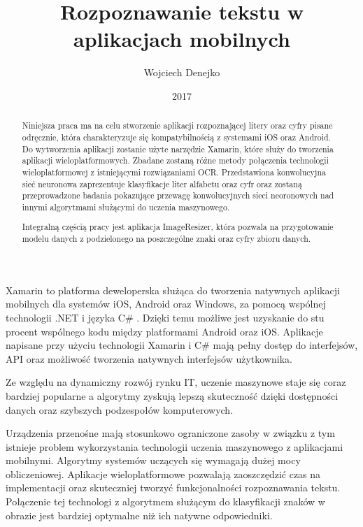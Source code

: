 \documentclass[brudnopis]{xmgr}
\author   {Wojciech Denejko}
\title    {Rozpoznawanie tekstu w aplikacjach mobilnych}
\date     {2017}
\begin{document}
\begin{abstract}
  Niniejsza praca ma na celu stworzenie aplikacji rozpoznającej litery oraz cyfry pisane odręcznie, która charakteryzuje się kompatybilnością z systemami iOS oraz Android. Do wytworzenia aplikacji zostanie użyte narzędzie Xamarin, które służy do tworzenia aplikacji wieloplatformowych. Zbadane zostaną różne metody połączenia technologii wieloplatformowej z istniejącymi rozwiązaniami OCR. Przedstawiona konwolucyjna sieć neuronowa zaprezentuje klasyfikacje liter alfabetu oraz cyfr oraz zostaną przeprowadzone badania pokazujące przewagę konwolucyjnych sieci neoronowych nad innymi algorytmami służącymi do uczenia maszynowego.
  
  Integralną częścią pracy jest aplikacja ImageResizer, która pozwala na przygotowanie modelu danych z podzielonego na poszczególne znaki oraz cyfry zbioru danych.
  
\end{abstract}


\maketitle

\introduction

	Xamarin to platforma deweloperska służąca do tworzenia natywnych aplikacji mobilnych dla systemów iOS, Android oraz Windows, za pomocą wspólnej technologii .NET i języka C\# . Dzięki temu możliwe jest uzyskanie do stu procent wspólnego kodu między platformami Android oraz iOS. Aplikacje napisane przy użyciu technologii Xamarin i C\# mają pełny dostęp do interfejsów, API oraz możliwość tworzenia natywnych interfejsów użytkownika.
  
  Ze względu na dynamiczny rozwój rynku IT, uczenie maszynowe staje się coraz bardziej popularne a algorytmy zyskują lepszą skuteczność dzięki dostępności danych oraz szybszych podzespołów komputerowych. 
  
  Urządzenia przenośne mają stosunkowo ograniczone zasoby w związku z tym istnieje problem wykorzystania technologii uczenia maszynowego z aplikacjami mobilnymi. Algorytmy systemów uczących się wymagają dużej mocy obliczeniowej. Aplikacje wieloplatformowe pozwalają zaoszczędzić czas na implementacji oraz skuteczniej tworzyć funkcjonalności rozpoznawania tekstu. Połączenie tej technologi z algorytmem służącym do klasyfikacji znaków w obrazie jest bardziej optymalne niż ich natywne odpowiedniki.
  
\end{document}
